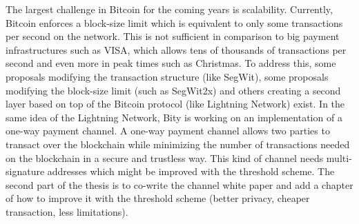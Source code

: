 The largest challenge in Bitcoin for the coming years is scalability. Currently, Bitcoin enforces
a block-size limit which is equivalent to only some transactions per second on the network. This
is not sufficient in comparison to big payment infrastructures such as VISA, which allows tens of
thousands of transactions per second and even more in peak times such as Christmas. To address this,
some proposals modifying the transaction structure (like SegWit), some proposals modifying the
block-size limit (such as SegWit2x) and others creating a second layer based on top of the Bitcoin
protocol (like Lightning Network) exist. In the same idea of the Lightning Network, Bity is working
on an implementation of a one-way payment channel. A one-way payment channel allows two parties to
transact over the blockchain while minimizing the number of transactions needed on the blockchain
in a secure and trustless way. This kind of channel needs multi-signature addresses which might be
improved with the threshold scheme. The second part of the thesis is to co-write the channel white
paper and add a chapter of how to improve it with the threshold scheme (better privacy, cheaper
transaction, less limitations).
